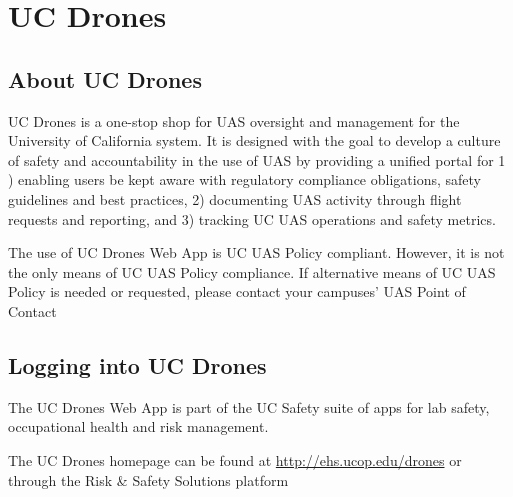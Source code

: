 \documentclass[
]{book}
\begin{document}
\hypertarget{part-uc-drones}{%
\part{UC Drones}\label{part-uc-drones}}

\hypertarget{ch-about-UCdrones}{%
\chapter{About UC Drones}\label{ch-about-UCdrones}}

UC Drones is a one-stop shop for UAS oversight and management for the University of California system. It is designed with the goal to develop a culture of safety and accountability in the use of UAS by providing a unified portal for 1 ) enabling users be kept aware with regulatory compliance obligations, safety guidelines and best practices, 2) documenting UAS activity through flight requests and reporting, and 3) tracking UC UAS operations and safety metrics.

The use of UC Drones Web App is UC UAS Policy compliant. However, it is not the only means of UC UAS Policy compliance. If alternative means of UC UAS Policy is needed or requested, please contact your campuses' UAS Point of Contact

\hypertarget{ch-UCdrones-login}{%
\chapter{Logging into UC Drones}\label{ch-UCdrones-login}}

The UC Drones Web App is part of the UC Safety suite of apps for lab safety, occupational health and risk management.

The UC Drones homepage can be found at \url{http://ehs.ucop.edu/drones} or through the Risk \& Safety Solutions platform
\end{document}
